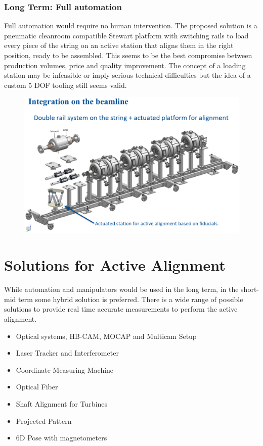\documentclass[12pt,a4paper]{article}
\begin{document}
\newpage
\subsubsection{Long Term: Full automation}
Full automation would require no human intervention. The proposed solution is a pneumatic cleanroom compatible Stewart platform with switching rails to load every piece of the string on an active station that aligns them in the right position, ready to be assembled. This seems to be the best compromise between production volumes, price and quality improvement. The concept of a loading station may be infeasible or imply serious technical difficulties but the idea of a custom 5 DOF tooling still seems valid.

\begin{figure}[h!]
\centering
\includegraphics[width=\textwidth]{35.png}
\end{figure}


\clearpage
\newpage

\section{Solutions for Active Alignment}

While automation and manipulators would be used in the long term, in the short-mid term some hybrid solution is preferred. There is a wide range of possible solutions to provide real time accurate measurements to perform the active alignment.
\begin{itemize}
    \item Optical systems, HB-CAM, MOCAP and Multicam Setup
    \item Laser Tracker and Interferometer
    \item Coordinate Measuring Machine
    \item Optical Fiber
    \item Shaft Alignment for Turbines
    \item Projected Pattern
    \item 6D Pose with magnetometers

\end{itemize}
\end{document}
